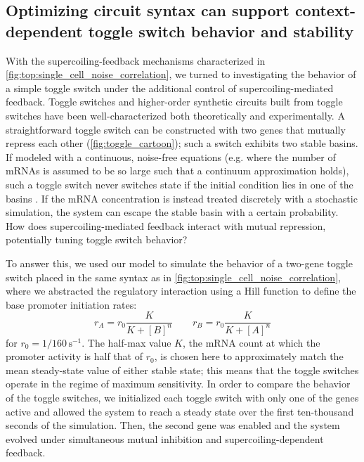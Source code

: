 \documentclass[11pt]{article}
\begin{document}
\subsection{Optimizing circuit syntax can support context-dependent toggle switch behavior and stability}
With the supercoiling-feedback mechanisms characterized in \cref{fig:top:single_cell_noise_correlation}, we turned to investigating the behavior of a simple toggle switch under the additional control of supercoiling-mediated feedback.
Toggle switches and higher-order synthetic circuits built from toggle switches have been well-characterized both theoretically \parencite{gardnerConstructionGeneticToggle2000} and experimentally.\parencite{zhuSyntheticMultistabilityMammalian2021} %
A straightforward toggle switch can be constructed with two genes that mutually repress each other (\cref{fig:toggle_cartoon}); such a switch exhibits two stable basins. If modeled with a continuous, noise-free equations (e.g. where the number of mRNAs is assumed to be so large such that a continuum approximation holds), such a toggle switch never switches state if the initial condition lies in one of the basins \parencite{gardnerConstructionGeneticToggle2000}. If the mRNA concentration is instead treated discretely with a stochastic simulation, the system can escape the stable basin with a certain probability. How does supercoiling-mediated feedback interact with mutual repression, potentially tuning toggle switch behavior?

To answer this, we used our model to simulate the behavior of a two-gene toggle switch placed in the same syntax as in \cref{fig:top:single_cell_noise_correlation}, where we abstracted the regulatory interaction using a Hill function to define the base promoter initiation rates:
\begin{equation}
    r_A = r_0 \frac{K}{K + [B]^n} \qquad r_B = r_0 \frac{K}{K + [A]^n}
\end{equation}
for \(r_0 = 1/160 \,\text{s}^{-1}\). The half-max value \(K\), the mRNA count at which the promoter activity is half that of \(r_0\), is chosen here to approximately match the mean steady-state value of either stable state; this means that the toggle switches operate in the regime of maximum sensitivity. In order to compare the behavior of the toggle switches, we initialized each toggle switch with only one of the genes active and allowed the system to reach a steady state over the first ten-thousand seconds of the simulation. Then, the second gene was enabled and the system evolved under simultaneous mutual inhibition and supercoiling-dependent feedback.
\end{document}
